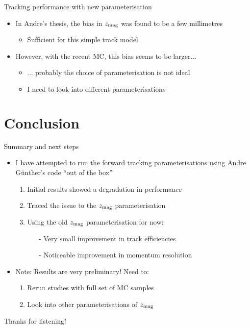 \documentclass[xcolor={dvipsnames}]{beamer}
\begin{document}
\begin{frame}{Tracking performance with new parameterisation}
\begin{itemize}
    \setlength\itemsep{1.0em}
    \item{In Andre's thesis, the bias in $z_{\rm mag}$ was found to be a few millimetres}
    \begin{itemize}
      \item{Sufficient for this simple track model}
    \end{itemize}
    \item{However, with the recent MC, this bias seems to be larger...}
    \begin{itemize}
      \item{... probably the choice of parameterisation is not ideal}
      \item{I need to look into different parameterisations}
    \end{itemize}
  \end{itemize}
  \vspace{0.9cm}
\end{frame}

\section{Conclusion}

\begin{frame}{Summary and next steps}
  \vspace{0.0cm}
  \begin{itemize}
    \setlength\itemsep{1.0em}
    \item{I have attempted to run the forward tracking parameterisations using Andre G{\"u}nther's code ``out of the box''}
    \begin{enumerate}
      \setlength\itemsep{0.3em}
      \item{Initial results showed a degradation in performance}
      \item{Traced the issue to the $z_{\rm mag}$ parameterisation}
      \item{Using the old $z_{\rm mag}$ parameterisation for now:}
      \begin{itemize}
        \item[-]{Very small improvement in track efficiencies}
        \item[-]{Noticeable improvement in momentum resolution}
      \end{itemize}
    \end{enumerate}
    \item{Note: Results are very preliminary! Need to:}
    \begin{enumerate}
      \setlength\itemsep{0.3em}
      \item{Rerun studies with full set of MC samples}
      \item{Look into other parameterisations of $z_{\rm mag}$}
    \end{enumerate}
  \end{itemize}
  \vspace{0.3cm}
  \begin{center}
    \Huge Thanks for listening!
  \end{center}
\end{frame}
\end{document}
